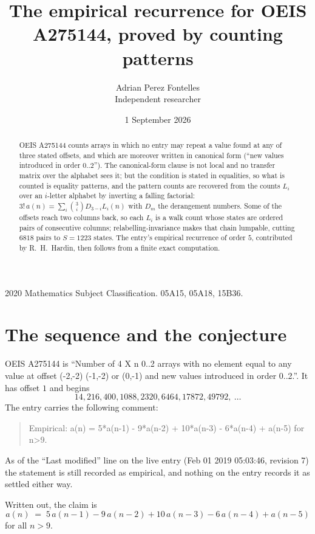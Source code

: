 \documentclass[11pt,a4paper]{article}
\title{The empirical recurrence for OEIS A275144, proved by counting patterns}
\author{Adrian Perez Fontelles\\ \small Independent researcher}
\date{1 September 2026}
\theoremstyle{plain}
\theoremstyle{definition}
\begin{document}
\maketitle

\begin{abstract}
OEIS A275144 counts arrays in which no entry may repeat a value found at any of three stated
offsets, and which are moreover written in canonical form (``new values introduced in order
$0..2$''). The canonical-form clause is not local and no transfer matrix over the
alphabet sees it; but the condition is stated in equalities, so what is counted is equality
patterns, and the pattern counts are recovered from the counts $L_i$ over an $i$-letter
alphabet by inverting a falling factorial:
$3!\,a(n)=\sum_i\binom{3}{i}D_{3-i}L_i(n)$ with $D_m$ the derangement numbers.
Some of the offsets reach two columns back, so each $L_i$ is a walk count whose states are
ordered pairs of consecutive columns; relabelling-invariance makes that chain lumpable,
cutting $6818$ pairs to $S=1223$ states. The entry's empirical recurrence of order $5$,
contributed by R.~H.~Hardin, then follows from a finite exact computation.
\end{abstract}

\noindent\small 2020 Mathematics Subject Classification. 05A15, 05A18, 15B36.\normalsize

\section{The sequence and the conjecture}

OEIS A275144 is ``Number of 4 X n 0..2 arrays with no element equal to any value at offset (-2,-2) (-1,-2) or (0,-1) and new values introduced in order 0..2.''. It has offset $1$ and begins
\[
14, 216, 400, 1088, 2320, 6464, 17872, 49792,\ \dots
\]
The entry carries the following comment:
\begin{quote}\small
Empirical: a(n) = 5*a(n-1) - 9*a(n-2) + 10*a(n-3) - 6*a(n-4) + a(n-5) for n>9.
\end{quote}
As of the ``Last modified'' line on the live entry (Feb 01 2019 05:03:46, revision 7) the statement is
still recorded as empirical, and nothing on the entry records it as settled either way.

Written out, the claim is
\begin{equation}\label{eq:conj}
a(n)\;=\;5\,a(n-1) - 9\,a(n-2) + 10\,a(n-3) - 6\,a(n-4) + a(n-5)
\end{equation}
for all $n>9$.
\end{document}
